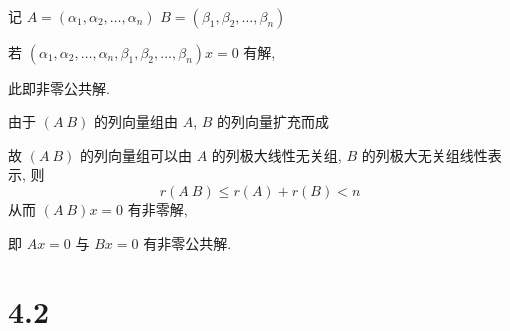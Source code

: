      \paragraph{} %
         记 $A = (\alpha_{1}, \alpha_{2}, \dots, \alpha_{n})$ $B = (\beta_{1}, \beta_{2}, \dots, \beta_{n})$

         若 $(\alpha_{1}, \alpha_{2}, \dots, \alpha_{n}, \beta_{1}, \beta_{2}, \dots, \beta_{n})x = 0$ 有解,

         此即非零公共解.

         由于 $(A\ B)$ 的列向量组由 $A$, $B$ 的列向量扩充而成

         故 $(A\ B)$ 的列向量组可以由 \(A\) 的列极大线性无关组, \(B\) 的列极大无关组线性表示, 则
         \[ r(A\ B) \leq r(A) + r(B) < n \]
         从而 $(A\ B)x = 0$ 有非零解,

         即 $Ax=0$ 与 $Bx=0$ 有非零公共解.


\section{4.2}

 \subsection{} %

